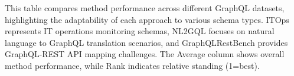 
\begin{table}[htbp]
\centering
\caption{Method Performance Across Different Datasets}
\label{tab:method_comparison}
\end{table}

This table compares method performance across different GraphQL datasets, highlighting the adaptability of each approach to various schema types. ITOps represents IT operations monitoring schemas, NL2GQL focuses on natural language to GraphQL translation scenarios, and GraphQLRestBench provides GraphQL-REST API mapping challenges. The Average column shows overall method performance, while Rank indicates relative standing (1=best).

